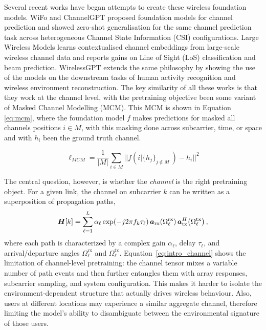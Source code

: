 Several recent works have began attempts to create these wireless foundation models. WiFo \cite{liu2025wifo} and ChannelGPT \cite{yu2024channelgpt} proposed foundation models for channel prediction and showed zero-shot generalisation for the same channel prediction task across heterogeneous Channel State Information (CSI) configurations. Large Wireless Models \cite{alikhani2024lwm} learns contextualised channel embeddings from large-scale wireless channel data and reports gains on Line of Sight (LoS) classification and beam prediction.  WirelessGPT \cite{yang2025wirelessgpt} extends the same philosophy by showing the use of the models on the downstream tasks of human activity recognition and wireless environment reconstruction. The key similarity of all these works is that they work at the channel level, with the pretraining objective been some variant of Masked Channel Modelling (MCM). This MCM is shown in Equation \ref{eq:mcm}, where the foundation model $f$ makes predictions for masked all channels positions $i \in M$, with this masking done across subcarrier, time, or space and with $h_{i}$  been the ground truth channel.

\begin{equation}
\ell_{MCM} = \frac{1}{|M|} \sum_{i \in M} || f({i|\{h_{j}\}_{j \notin M }\ }) - h_{i} ||^{2}
\label{eq:mcm}
\end{equation}




The central question, however, is whether the \emph{channel} is the right pretraining object. For a given link, the channel on subcarrier $k$ can be written as a superposition of propagation paths,
\begin{equation}
\boldsymbol{H}[k]
=
\sum_{\ell=1}^{L}
\alpha_{\ell}
\exp\!\left(-j2\pi f_k\tau_{\ell}\right)
\boldsymbol{a}_{\mathrm{rx}}\!\left(\Omega^{\mathrm{rx}}_{\ell}\right)
\boldsymbol{a}_{\mathrm{tx}}^{H}\!\left(\Omega^{\mathrm{tx}}_{\ell}\right),
\label{eq:intro_channel}
\end{equation}
where each path is characterized by a complex gain $\alpha_{\ell}$, delay $\tau_{\ell}$, and arrival/departure angles $\Omega^{\mathrm{rx}}_{\ell}$ and $\Omega^{\mathrm{tx}}_{\ell}$. Equation~\eqref{eq:intro_channel} shows the limitation of channel-level pretraining: the channel tensor mixes a variable number of path events and then further entangles them with array responses, subcarrier sampling, and system configuration. This makes it harder to isolate the environment-dependent structure that actually drives wireless behaviour. Also, users at different locations may experience a similar aggregate channel, therefore limiting the model's ability to disambiguate between the environmental signature of those users. 

